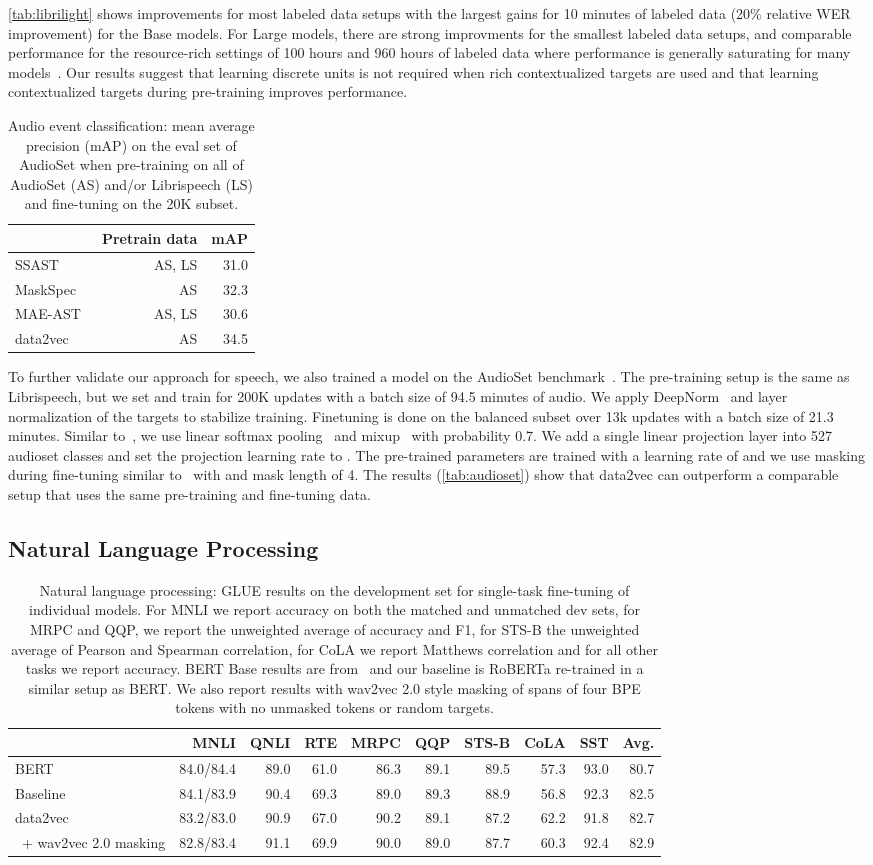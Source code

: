 \documentclass[nohyperref]{article}
\theoremstyle{plain}
\theoremstyle{definition}
\theoremstyle{remark}
\newcommand{\name}{data2vec}
\newcommand{\insertAStable}{
\begin{table}[h!]
\caption{Audio event classification: mean average precision (mAP) on the eval set of AudioSet when pre-training on all of AudioSet (AS) and/or Librispeech (LS) and fine-tuning on the 20K subset.
\label{tab:audioset}
}
\vspace{0.075in}
\centering 
\begin{tabular}{lrr}
\toprule
 & Pretrain data & mAP \\
\midrule
SSAST~\citep{gong2021ssast} & AS, LS & 31.0 \\
MaskSpec~\citep{chong2022maskspec} & AS & 32.3 \\
MAE-AST~\citep{baade2022} & AS, LS & 30.6 \\
\midrule
data2vec & AS & 34.5 \\
\bottomrule
\end{tabular}
\end{table}
}
\newcommand{\insertGLUEtable}{
\begin{table*}[h!]
\centering
\caption{Natural language processing: GLUE results on the development set for single-task fine-tuning of individual models.
For MNLI we report accuracy on both the matched and unmatched dev sets, for MRPC and QQP, we report the unweighted average of accuracy and F1, for STS-B the unweighted average of Pearson and Spearman correlation, for CoLA we report Matthews correlation and for all other tasks we report accuracy.
BERT Base results are from~\citet{wu2020clear} and our baseline is RoBERTa re-trained in a similar setup as BERT.
We also report results with wav2vec 2.0 style masking of spans of four BPE tokens with no unmasked tokens or random targets.
\label{tab:glue}} 
\vspace{0.075in}
\begin{tabular}{lrrrrrrrrr}
\toprule
& MNLI & QNLI & RTE & MRPC & QQP & STS-B & CoLA & SST & Avg.\\
\midrule
BERT~\citep{devlin2018bert} & 84.0/84.4 & 89.0 & 61.0 & 86.3 & 89.1 & 89.5 & 57.3 & 93.0 & 80.7\\
Baseline~\citep{liu2019roberta} & 84.1/83.9 & 90.4 & 69.3 & 89.0 & 89.3 & 88.9 & 56.8 & 92.3 & 82.5 \\ 
\midrule
\name{} & 83.2/83.0 & 90.9 & 67.0 & 90.2 & 89.1 & 87.2 & 62.2 & 91.8 & 82.7\\
~+ wav2vec 2.0 masking & 82.8/83.4 & 91.1 & 69.9 & 90.0 & 89.0 & 87.7 & 60.3 & 92.4 & 82.9 \\
\bottomrule
\end{tabular}
\end{table*}
}
\begin{document}
\autoref{tab:librilight} shows improvements for most labeled data setups with the largest gains for 10 minutes of labeled data (20\% relative WER improvement) for the Base models.
For Large models, there are strong improvments for the smallest labeled data setups, and comparable performance for the resource-rich settings of 100 hours and 960 hours of labeled data where performance is generally saturating for many models~\citep{zhang2020pushing,chung2021w2vbert}.
Our results suggest that learning discrete units is not required when rich contextualized targets are used and that learning contextualized targets during pre-training improves performance.

\insertAStable

To further validate our approach for speech, we also trained a model on the AudioSet benchmark~\citep{gemmeke2017audioset}. 
The pre-training setup is the same as Librispeech, but we set  and train for 200K updates with a batch size of 94.5 minutes of audio. 
We apply DeepNorm~\citep{wang2022deepnorm} and layer normalization of the targets to stabilize training. 
Finetuning is done on the balanced subset over 13k updates with a batch size of 21.3 minutes. 
Similar to~\citet{srivistava2021nonspeech}, we use linear softmax pooling~\citep{wang2018linsoftmax} and mixup~\citep{tokozume2017mixup} with probability 0.7. 
We add a single linear projection layer into 527 audioset classes and set the projection learning rate to . 
The pre-trained parameters are trained with a learning rate of  and we use masking during fine-tuning similar to~\citet{baevski2020wav} with  and mask length of 4. 
The results (\autoref{tab:audioset}) show that data2vec can outperform a comparable setup that uses the same pre-training and fine-tuning data.


\subsection{Natural Language Processing}
\label{sec:results_nlp}

\insertGLUEtable
\end{document}

